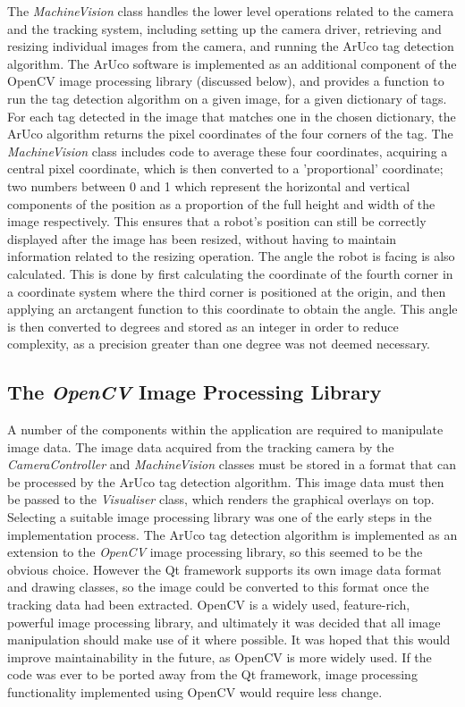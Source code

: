 The \textit{MachineVision} class handles the lower level operations related to the camera and the tracking system, including setting up the camera driver, retrieving and resizing individual images from the camera, and running the ArUco tag detection algorithm. The ArUco software is implemented as an additional component of the OpenCV image processing library \cite{OpenCV} (discussed below), and provides a function to run the tag detection algorithm on a given image, for a given dictionary of tags. For each tag detected in the image that matches one in the chosen dictionary, the ArUco algorithm returns the pixel coordinates of the four corners of the tag. The \textit{MachineVision} class includes code to average these four coordinates, acquiring a central pixel coordinate, which is then converted to a 'proportional' coordinate; two numbers between 0 and 1 which represent the horizontal and vertical components of the position as a proportion of the full height and width of the image respectively. This ensures that a robot's position can still be correctly displayed after the image has been resized, without having to maintain information related to the resizing operation. The angle the robot is facing is also calculated. This is done by first calculating the coordinate of the fourth corner in a coordinate system where the third corner is positioned at the origin, and then applying an arctangent function to this coordinate to obtain the angle. This angle is then converted to degrees and stored as an integer in order to reduce complexity, as a precision greater than one degree was not deemed necessary.


\subsection{The \textit{OpenCV} Image Processing Library}
A number of the components within the application are required to manipulate image data. The image data acquired from the tracking camera by the \textit{CameraController} and \textit{MachineVision} classes must be stored in a format that can be processed by the ArUco tag detection algorithm. This image data must then be passed to the \textit{Visualiser} class, which renders the graphical overlays on top. Selecting a suitable image processing library was one of the early steps in the implementation process. The ArUco tag detection algorithm is implemented as an extension to the \textit{OpenCV} image processing library, so this seemed to be the obvious choice. However the Qt framework supports its own image data format and drawing classes, so the image could be converted to this format once the tracking data had been extracted. OpenCV is a widely used, feature-rich, powerful image processing library, and ultimately it was decided that all image manipulation should make use of it where possible. It was hoped that this would improve maintainability in the future, as OpenCV is more widely used. If the code was ever to be ported away from the Qt framework, image processing functionality implemented using OpenCV would require less change.

